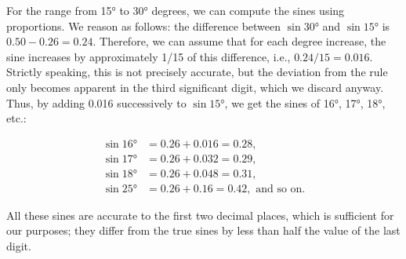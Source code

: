 For the range from \ang{15} to \ang{30} degrees, we can compute the sines using proportions. We reason as follows: the difference between $\sin \ang{30}$ and $\sin \ang{15}$ is $0.50 - 0.26 = 0.24$. Therefore, we can assume that for each degree increase, the sine increases by approximately 1/15 of this difference, i.e., $0.24/15 = 0.016$. Strictly speaking, this is not precisely accurate, but the deviation from the rule only becomes apparent in the third significant digit, which we discard anyway. Thus, by adding 0.016 successively to $\sin \ang{15}$, we get the sines of \ang{16}, \ang{17}, \ang{18}, etc.:
\begin{small}
\begin{align*}%
\sin \ang{16} &= 0.26 + 0.016 = 0.28,\\
\sin \ang{17} &= 0.26 + 0.032 = 0.29,\\
\sin \ang{18} &= 0.26 + 0.048 = 0.31,\\
\sin \ang{25} &= 0.26 + 0.16 = 0.42,\,\,\text{and so on.}
\end{align*}\label{page-130}
\end{small}
All these sines are accurate to the first two decimal places, which is sufficient for our purposes; they differ from the true sines by less than half the value of the last digit.

